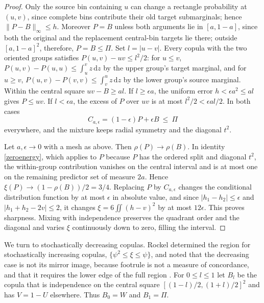 \documentclass[11pt,a4paper]{article}
\theoremstyle{remark}
\newcommand{\1}{\mathbf 1}
\newcommand{\dd}{\,\mathrm d}
\begin{document}
\begin{proof}
Only the source bin containing $u$ can change a rectangle probability at $(u,v)$, since complete bins contribute their old target submarginals; hence $\|P-B\|_\infty\le h$. Moreover $P=B$ unless both arguments lie in $[a,1-a]$, since both the original and the replacement central-bin targets lie there; outside $[a,1-a]^2$, therefore, $P=B\le\Pi$. Set $l=|u-v|$. Every copula with the two oriented groups satisfies $P(u,v)-uv\le l^2/2$: for $u\le v$, $P(u,v)-P(u,u)\le\int_u^v z\dd z$ by the upper group's target marginal, and for $u\ge v$, $P(u,v)-P(v,v)\le\int_v^u z\dd z$ by the lower group's source marginal. Within the central square $uv-B\ge al$. If $l\ge\epsilon a$, the uniform error $h<\epsilon a^2\le al$ gives $P\le uv$. If $l<\epsilon a$, the excess of $P$ over $uv$ is at most $l^2/2<\epsilon al/2$. In both cases
\[
 C_{a,\epsilon}=(1-\epsilon)P+\epsilon B\ \le\ \Pi
\]
everywhere, and the mixture keeps radial symmetry and the diagonal $t^2$.

Let $a,\epsilon\to0$ with a mesh as above. Then $\rho(P)\to\rho(B)$. In identity \eqref{zeroenergy}, which applies to $P$ because $P$ has the ordered split and diagonal $t^2$, the within-group contribution vanishes on the central interval and is at most one on the remaining predictor set of measure $2a$. Hence $\xi(P)\to(1-\rho(B))/2=3/4$. Replacing $P$ by $C_{a,\epsilon}$ changes the conditional distribution function by at most $\epsilon$ in absolute value, and since $|h_1-h_2|\le\epsilon$ and $|h_1+h_2-2v|\le2$, it changes $\xi=6\iint(h-v)^2$ by at most $12\epsilon$. This proves sharpness. Mixing with independence preserves the quadrant order and the diagonal and varies $\xi$ continuously down to zero, filling the interval.
\end{proof}

We turn to stochastically decreasing copulas. Rockel determined the region for stochastically increasing copulas, $\{\psi^2\le\xi\le\psi\}$, and noted that the decreasing case is not its mirror image, because footrule is not a measure of concordance, and that it requires the lower edge of the full region \cite[Remark~2(e)]{rockel}. For $0\le l\le1$ let $B_l$ be the copula that is independence on the central square $[(1-l)/2,(1+l)/2]^2$ and has $V=1-U$ elsewhere. Thus $B_0=W$ and $B_1=\Pi$.
\end{document}
